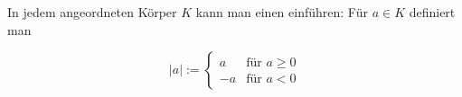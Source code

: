 In jedem angeordneten Körper $K$ kann man einen  einführen: Für $a \in K$ definiert man

$$|a| := \begin{cases} 
a & \text{für $a \geq 0$}\\ 
-a & \text{für $a < 0$}
\end{cases}
$$